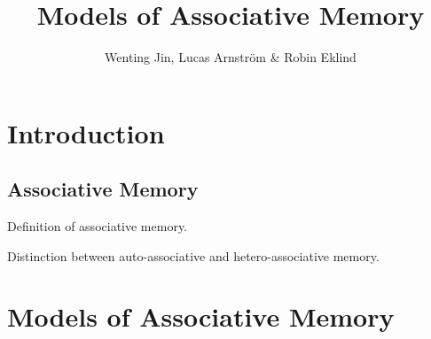 \documentclass[12pt, a4paper]{article}
\title{Models of Associative Memory}
\author{Wenting Jin, Lucas Arnström \& Robin Eklind}
\begin{document}
\maketitle

\tableofcontents

\clearpage



\section{Introduction}

\subsection{Associative Memory}

Definition of associative memory.

Distinction between auto-associative and hetero-associative memory.


%
%
%


\section{Models of Associative Memory}
\end{document}
